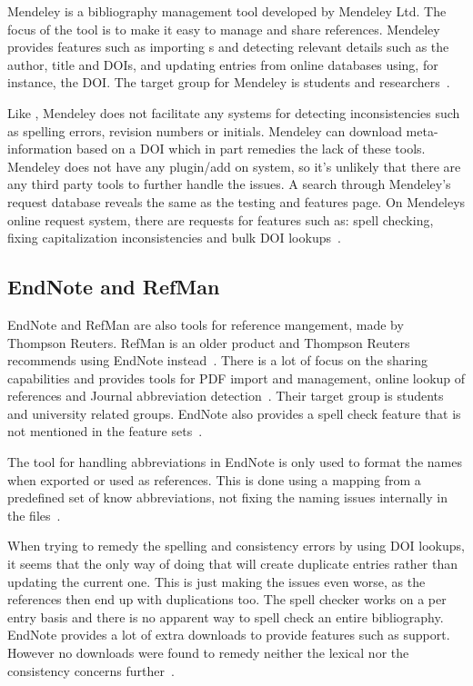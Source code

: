 Mendeley is a bibliography management tool developed by Mendeley Ltd.
The focus of the tool is to make it easy to manage and share
references.  Mendeley provides features such as importing s
and detecting relevant details such as the author, title and DOIs, and
updating entries from online databases using, for instance, the DOI.
The target group for Mendeley is students and
researchers~\cite{mendeley_features}.

Like {\bibtex}, Mendeley does not facilitate any systems for detecting
inconsistencies such as spelling errors, revision numbers or initials.
Mendeley can download meta-information based on a DOI which in part
remedies the lack of these tools.  Mendeley does not have any
plugin/add on system, so it's unlikely that there are any third party
tools to further handle the {\bibtex} issues. A search through
Mendeley's request database reveals the same as the testing and
features page.  On Mendeleys online request system, there are requests
for features such as: spell checking, fixing capitalization
inconsistencies and bulk DOI
lookups~\cite{mendeley_request_spellcheck, mendeley_request_lowercase,
  mendeley_request_capitalization, mendeley_request_bulk_doi}.

\subsection{EndNote and RefMan}
EndNote and RefMan are also tools for reference mangement, made by
Thompson Reuters.  RefMan is an older product and Thompson Reuters
recommends using EndNote instead~\cite{refman_switch,
  refman_features}.  There is a lot of focus on the sharing
capabilities and provides tools for PDF import and management, online
lookup of references and Journal abbreviation
detection~\cite{endnote_basic_features, endnote_x7_features}.  Their
target group is students and university related groups.  EndNote also
provides a spell check feature that is not mentioned in the feature
sets~\cite{endnote_spellcheck}.

The tool for handling abbreviations in EndNote is only used to format
the names when exported or used as references.  This is done using a
mapping from a predefined set of know abbreviations, not fixing the
naming issues internally in the files~\cite{endnote_terms_journals}.

When trying to remedy the spelling and consistency errors by using DOI
lookups, it seems that the only way of doing that will create
duplicate entries rather than updating the current one. This is just
making the issues even worse, as the references then end up with
duplications too.  The spell checker works on a per entry basis and
there is no apparent way to spell check an entire bibliography.
EndNote provides a lot of extra downloads to provide features such as
{\bibtex} support.  However no downloads were found to remedy neither
the lexical nor the consistency concerns
further~\cite{endnote_downloads}.


